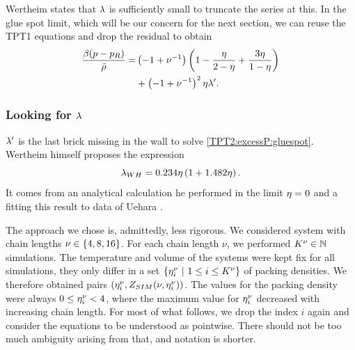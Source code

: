 \documentclass[8.5pt,twoside,twocolumn]{article}
\theoremstyle{standard}
\begin{document}
Wertheim states that $\lambda$ is sufficiently small to truncate the series at this.
In the glue spot limit, which will be our concern for the next section, we
can reuse the TPT1 equations and drop the residual to obtain
\begin{equation}
\begin{aligned}
\frac{\beta(p-p_R)}{\bar\rho}=&\left({-1+\nu^{-1}}\right)\left({1-\frac\eta{2-\eta}+\frac{3\eta}{1-\eta}}\right)\\
&+\left({-1+\nu^{-1}}\right)^2\eta\lambda'.
\end{aligned}
\label{TPT2:excessP:gluespot}
\end{equation}

\subsubsection{Looking for $\lambda$}
$\lambda'$ is the last brick missing in the wall to solve \eqref{TPT2:excessP:gluespot}. Wertheim himself
proposes the expression
\renewcommand\infty{{all}}
\newcommand\lawh{\la_{WH}}
\newcommand\lao{\la_{opt}}
\newcommand\lanu{\la'_{\tilde \nu}}
\newcommand\laf{\la'_{4}}
\newcommand\lae{\la'_{8}}
\newcommand\las{\la'_{16}}
\newcommand\lai{\la'_{\infty}}
\newcommand\zsim{Z_{SIM}}
\newcommand\zr{Z_{R}}
\newcommand\enui{\e^\nu_i}
\begin{equation}
\lawh=0.234 \e\rb{1+1.482\e}.
\label{TPT:la:laWH}
\end{equation}
It comes from an analytical calculation he performed in the limit $\eta=0$ and
a fitting this result to data of Uehara \etal\cite{Uehara1979}.

The approach we chose is, admittedly, less rigorous. We considered system with chain
lengths \mbox{$\nu\in\left\{{4,8,16} \right\}$}.
For each chain length $\nu$, we performed $K^\nu\in\mathbb{N}$ simulations\cite{Westen2013}.
The temperature and volume of the systems were kept fix for all simulations, they only differ in a set
\mbox{$\st{\enui\ |\ 1 \le i \le K^\nu}$} of packing densities. We therefore obtained
pairs \mbox{$(\enui,\zsim(\nu,\e^\nu_i))$}. The values for the packing density were always 
$0\le\enui< 4$, where the maximum value for $\enui$ decreased with increasing chain length.
For most of what follows, we drop the index $i$ again and consider the equations to be
understood as pointwise. There should not be too much ambiguity arising from that, and notation
is shorter.
\end{document}
